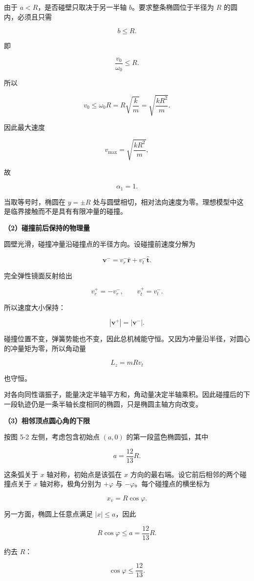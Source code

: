 \documentclass[12pt,a4paper,UTF8]{ctexart}
\begin{document}
由于 \(a<R\)，是否碰壁只取决于另一半轴 \(b\)。要求整条椭圆位于半径为
\(R\) 的圆内，必须且只需

\[b\le R.\]

即

\[
\frac{v_0}{\omega_0}\le R.
\]

所以

\[
v_0\le\omega_0R
=R\sqrt{\frac{k}{m}}
=\sqrt{\frac{kR^2}{m}}.
\]

因此最大速度

\[
v_{\max}=\sqrt{\frac{kR^2}{m}},
\]

故

\[
\boxed{\alpha_1=1}.
\]

当取等号时，椭圆在 \(y=\pm R\)
处与圆壁相切，相对法向速度为零。理想模型中这是临界接触而不是具有有限冲量的碰撞。

\textbf{（2）碰撞前后保持的物理量}

圆壁光滑，碰撞冲量沿碰撞点的半径方向。设碰撞前速度分解为

\[\bm v^- =v_r^-\hat{\bm r}+v_t^-\hat{\bm t}.\]

完全弹性镜面反射给出

\[
v_r^+=-v_r^-,\qquad v_t^+=v_t^-.
\]

所以速度大小保持：

\[|\bm v^+|=|\bm v^-|.\]

碰撞位置不变，弹簧势能也不变，因此总机械能守恒。又因为冲量沿半径，对圆心的冲量矩为零，所以角动量

\[L_z=mRv_t\]

也守恒。

对各向同性谐振子，能量决定半轴平方和，角动量决定半轴乘积。因此碰撞后的下一段轨迹仍是一条半轴长度相同的椭圆，只是椭圆主轴方向改变。

\textbf{（3）相邻顶点圆心角的下限}

按图 5-2 左侧，考虑包含初始点 \((a,0)\) 的第一段蓝色椭圆弧，其中

\[a=\frac{12}{13}R.\]

这条弧关于 \(x\) 轴对称，初始点是该弧在 \(x\)
方向的最右端。设它前后相邻的两个碰撞点关于 \(x\) 轴对称，极角分别为
\(+\varphi\) 与 \(-\varphi\)。每个碰撞点的横坐标为

\[x_v=R\cos\varphi.\]

另一方面，椭圆上任意点满足 \(|x|\le a\)，因此

\[
R\cos\varphi\le a=\frac{12}{13}R.
\]

约去 \(R\)：

\[
\cos\varphi\le\frac{12}{13}.
\]
\end{document}
